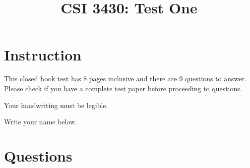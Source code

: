 \documentclass{article}
\begin{document}
\title{CSI 3430: Test One}

\date{}

\maketitle

\section*{Instruction}

This closed book test has 8 pages inclusive and there are 9 questions to answer. Please check if you
have a complete test paper before proceeding to questions.
\vspace{2pc}

 \noindent
Your handwriting must be legible. \vspace{2pc}

\noindent Write your name below. \vspace{2pc}



\pagebreak

\section*{Questions}
\end{document}
